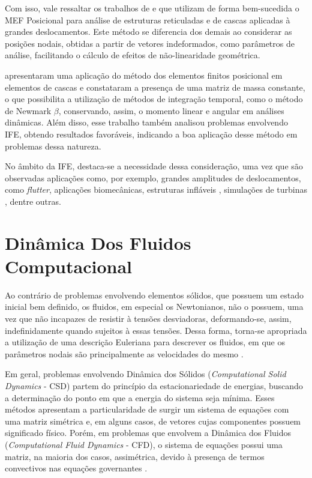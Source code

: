 \documentclass[_ArquivoPrincipal.tex]{subfiles}
\begin{document}
Com isso, vale ressaltar os trabalhos de  e  que utilizam de forma bem-sucedida o MEF Posicional para análise de estruturas reticuladas e de cascas aplicadas à grandes deslocamentos. Este método se diferencia dos demais ao considerar as posições nodais, obtidas a partir de vetores indeformados, como parâmetros de análise, facilitando o cálculo de efeitos de não-linearidade geométrica.

 apresentaram uma aplicação do método dos elementos finitos posicional em elementos de cascas e constataram a presença de uma matriz de massa constante, o que possibilita a utilização de métodos de integração temporal, como o método de Newmark $\beta$, conservando, assim, o momento linear e angular em análises dinâmicas. Além disso, esse trabalho também analisou problemas envolvendo IFE, obtendo resultados favoráveis, indicando a boa aplicação desse método em problemas dessa natureza.

No âmbito da IFE, destaca-se a necessidade dessa consideração, uma vez que são observadas aplicações como, por exemplo, grandes amplitudes de deslocamentos, como \textit{flutter}, aplicações biomecânicas, estruturas infláveis \cite{karagiozis2011computational}, simulações de turbinas \cite{bazilevs20113d}, dentre outras.

\section{Dinâmica Dos Fluidos Computacional} \label{CFD}

Ao contrário de problemas envolvendo elementos sólidos, que possuem um estado inicial bem definido, os fluidos, em especial os Newtonianos, não o possuem, uma vez que não incapazes de resistir à tensões desviadoras, deformando-se, assim, indefinidamente quando sujeitos à essas tensões. Dessa forma, torna-se apropriada a utilização de uma descrição Euleriana para descrever os fluidos, em que os parâmetros nodais são principalmente as velocidades do mesmo \cite{fernandes2020tecnica}.

Em geral, problemas envolvendo Dinâmica dos Sólidos (\textit{Computational Solid Dynamics} - CSD) partem do princípio da estacionariedade de energias, buscando a determinação do ponto em que a energia do sistema seja mínima. Esses métodos apresentam a particularidade de surgir um sistema de equações com uma matriz simétrica e, em alguns casos, de vetores cujas componentes possuem significado físico. Porém, em problemas que envolvem a Dinâmica dos Fluidos (\textit{Computational Fluid Dynamics} - CFD), o sistema de equações possui uma matriz, na maioria dos casos, assimétrica, devido à presença de termos convectivos nas equações governantes \cite{bazilevs2013computational,brooks1982streamline}.
\end{document}
